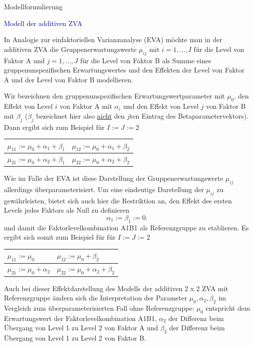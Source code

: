 \documentclass[
  8pt,
  ignorenonframetext,
]{beamer}
\begin{document}
\begin{frame}{Modellformulierung}
\protect\hypertarget{modellformulierung}{}
\vspace{1mm}

\textcolor{darkblue}{Modell der additiven ZVA} 
\footnotesize

In Analogie zur einfaktoriellen Varianzanalyse (EVA) möchte man in der
additiven ZVA die Gruppenerwartungswerte \(\mu_{ij}\) mit
\(i = 1,...,I\) für die Level von Faktor A und \(j = 1,...,J\) für die
Level von Faktor B als Summe eines gruppenunspezifischen
Erwartungswertes und den Effekten der Level von Faktor A und der Level
von Faktor B modellieren.

Wir bezeichnen den gruppenunspezifischen Erwartungswertparameter mit
\(\mu_0\), den Effekt von Level \(i\) von Faktor A mit \(\alpha_i\) und
den Effekt von Level \(j\) von Faktor B mit \(\beta_j\) (\(\beta_j\)
bezeichnet hier also \underline{nicht} den \(j\)ten Eintrag des
Betaparametervektors). Dann ergibt sich zum Beispiel für \(I := J := 2\)

\begin{center}
\begin{tabular}{l|l}
$\mu_{11} := \mu_0 + \alpha_1 + \beta_1$ & $\mu_{12} := \mu_0 + \alpha_1 + \beta_2$ \\\hline
$\mu_{21} := \mu_0 + \alpha_2 + \beta_1$ & $\mu_{22} := \mu_0 + \alpha_2 + \beta_2$ \\
\end{tabular}
\end{center}

Wie im Falle der EVA ist diese Darstellung der Gruppenerwartungswerte
\(\mu_{ij}\) allerdings überparameterisiert. Um eine eindeutige
Darstellung der \(\mu_{ij}\) zu gewährleisten, bietet sich auch hier die
Restriktion an, den Effekt des ersten Levels jedes Faktors als Null zu
definieren \begin{equation}
\alpha_1 := \beta_1 := 0.
\end{equation} und damit die Faktorlevelkombination A1B1 als
Referenzgruppe zu etablieren. Es ergibt sich somit zum Beispiel für für
\(I := J := 2\)

\begin{center}
\begin{tabular}{l|l}
$\mu_{11} := \mu_0$            & $\mu_{12} := \mu_0 + \beta_2$            \\\hline
$\mu_{21} := \mu_0 + \alpha_2$ & $\mu_{22} := \mu_0 + \alpha_2 + \beta_2$ \\
\end{tabular}
\end{center}

Auch bei dieser Effektdarstellung des Modells der additiven 2 x 2 ZVA
mit Referenzgruppe ändern sich die Interpretation der Parameter
\(\mu_0,\alpha_2,\beta_2\) im Vergleich zum überparameterisierten Fall
ohne Referenzgruppe: \(\mu_0\) entspricht dem Erwartungswert der
Faktorlevelkombination A1B1, \(\alpha_2\) der Differenz beim Übergang
von Level 1 zu Level 2 von Faktor A und \(\beta_2\) der Differenz beim
Übergang von Level 1 zu Level 2 von Faktor B.
\end{frame}
\end{document}
